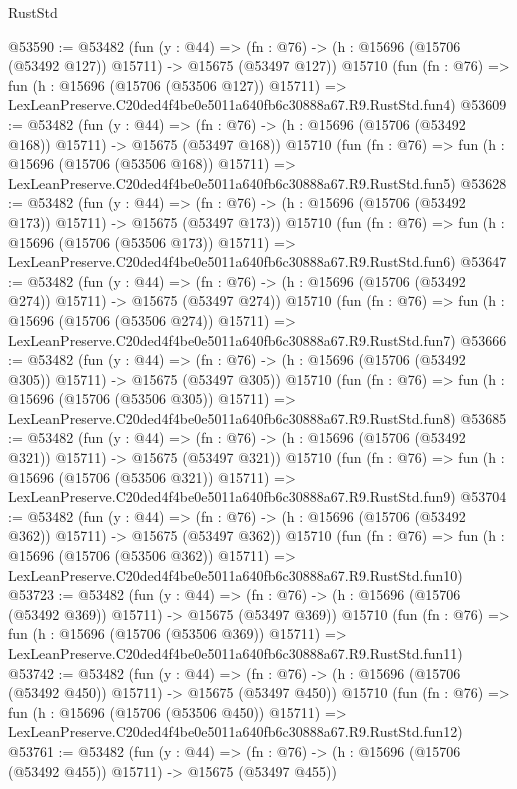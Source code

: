\begin{lexlean}{RustStd}
\begin{coremodule}
@53590 := @53482
    (fun (y : @44) =>
    (fn : @76) -> (h : @15696 (@15706 (@53492 @127)) @15711) -> @15675 (@53497 @127))
    @15710
    (fun (fn : @76) =>
    fun (h : @15696 (@15706 (@53506 @127)) @15711) =>
    LexLeanPreserve.C20ded4f4be0e5011a640fb6c30888a67.R9.RustStd.fun4)
@53609 := @53482
    (fun (y : @44) =>
    (fn : @76) -> (h : @15696 (@15706 (@53492 @168)) @15711) -> @15675 (@53497 @168))
    @15710
    (fun (fn : @76) =>
    fun (h : @15696 (@15706 (@53506 @168)) @15711) =>
    LexLeanPreserve.C20ded4f4be0e5011a640fb6c30888a67.R9.RustStd.fun5)
@53628 := @53482
    (fun (y : @44) =>
    (fn : @76) -> (h : @15696 (@15706 (@53492 @173)) @15711) -> @15675 (@53497 @173))
    @15710
    (fun (fn : @76) =>
    fun (h : @15696 (@15706 (@53506 @173)) @15711) =>
    LexLeanPreserve.C20ded4f4be0e5011a640fb6c30888a67.R9.RustStd.fun6)
@53647 := @53482
    (fun (y : @44) =>
    (fn : @76) -> (h : @15696 (@15706 (@53492 @274)) @15711) -> @15675 (@53497 @274))
    @15710
    (fun (fn : @76) =>
    fun (h : @15696 (@15706 (@53506 @274)) @15711) =>
    LexLeanPreserve.C20ded4f4be0e5011a640fb6c30888a67.R9.RustStd.fun7)
@53666 := @53482
    (fun (y : @44) =>
    (fn : @76) -> (h : @15696 (@15706 (@53492 @305)) @15711) -> @15675 (@53497 @305))
    @15710
    (fun (fn : @76) =>
    fun (h : @15696 (@15706 (@53506 @305)) @15711) =>
    LexLeanPreserve.C20ded4f4be0e5011a640fb6c30888a67.R9.RustStd.fun8)
@53685 := @53482
    (fun (y : @44) =>
    (fn : @76) -> (h : @15696 (@15706 (@53492 @321)) @15711) -> @15675 (@53497 @321))
    @15710
    (fun (fn : @76) =>
    fun (h : @15696 (@15706 (@53506 @321)) @15711) =>
    LexLeanPreserve.C20ded4f4be0e5011a640fb6c30888a67.R9.RustStd.fun9)
@53704 := @53482
    (fun (y : @44) =>
    (fn : @76) -> (h : @15696 (@15706 (@53492 @362)) @15711) -> @15675 (@53497 @362))
    @15710
    (fun (fn : @76) =>
    fun (h : @15696 (@15706 (@53506 @362)) @15711) =>
    LexLeanPreserve.C20ded4f4be0e5011a640fb6c30888a67.R9.RustStd.fun10)
@53723 := @53482
    (fun (y : @44) =>
    (fn : @76) -> (h : @15696 (@15706 (@53492 @369)) @15711) -> @15675 (@53497 @369))
    @15710
    (fun (fn : @76) =>
    fun (h : @15696 (@15706 (@53506 @369)) @15711) =>
    LexLeanPreserve.C20ded4f4be0e5011a640fb6c30888a67.R9.RustStd.fun11)
@53742 := @53482
    (fun (y : @44) =>
    (fn : @76) -> (h : @15696 (@15706 (@53492 @450)) @15711) -> @15675 (@53497 @450))
    @15710
    (fun (fn : @76) =>
    fun (h : @15696 (@15706 (@53506 @450)) @15711) =>
    LexLeanPreserve.C20ded4f4be0e5011a640fb6c30888a67.R9.RustStd.fun12)
@53761 := @53482
    (fun (y : @44) =>
    (fn : @76) -> (h : @15696 (@15706 (@53492 @455)) @15711) -> @15675 (@53497 @455))

\end{coremodule}
\end{lexlean}

